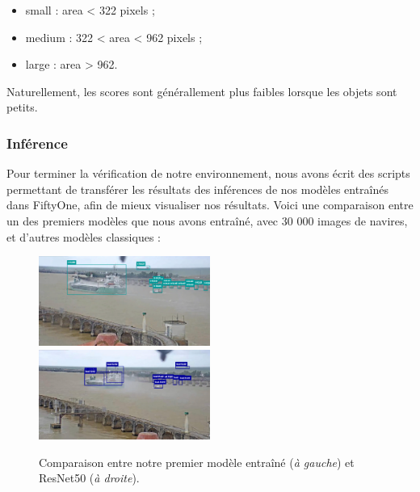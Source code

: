\begin{itemize}
    \item small : area < 322 pixels ;
    \item medium : 322 < area < 962 pixels ;
    \item large : area > 962.
\end{itemize}

Naturellement, les scores sont générallement plus faibles lorsque les objets sont petits.

\subsubsection{Inférence}

Pour terminer la vérification de notre environnement, nous avons écrit des scripts permettant de
transférer les résultats des inférences de nos modèles entraînés dans FiftyOne, afin de mieux visualiser
nos résultats. Voici une comparaison entre un des premiers modèles que nous avons entraîné, avec 30 000 images
de navires, et d'autres modèles classiques :

\begin{figure}[H]
        \includegraphics[width=0.5\textwidth]{./img/first_inference.png}
        \includegraphics[width=0.5\textwidth]{./img/resnet_inference.png}
        \caption{Comparaison entre notre premier modèle entraîné (\textit{à gauche}) et ResNet50 (\textit{à droite}).}
\end{figure}

